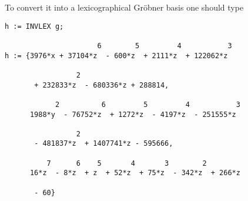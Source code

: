 To convert it into a lexicographical Gr\"obner basis one should type
\begin{verbatim}
h := INVLEX g;

                      6        5         4           3
h := {3976*x + 37104*z  - 600*z  + 2111*z  + 122062*z

                 2
       + 232833*z  - 680336*z + 288814,

            2          6         5         4           3
      1988*y  - 76752*z  + 1272*z  - 4197*z  - 251555*z

                 2
       - 481837*z  + 1407741*z - 595666,

          7      6    5       4       3        2
      16*z  - 8*z  + z  + 52*z  + 75*z  - 342*z  + 266*z

       - 60}
\end{verbatim}

